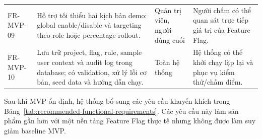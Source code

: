 \begin{table}[H]
\begin{tabular}{p{} p{} p{} p{}}
        FR-MVP-09 & Hỗ trợ tối thiểu hai kịch bản demo: global enable/disable và targeting theo role hoặc percentage rollout. & Quản trị viên, người dùng cuối & Người chấm có thể quan sát trực tiếp giá trị của Feature Flag. \\
        FR-MVP-10 & Lưu trữ project, flag, rule, sample user context và audit log trong database; có validation, xử lý lỗi cơ bản, seed data và hướng dẫn chạy. & Toàn hệ thống & Hệ thống có thể khởi chạy lặp lại và phục vụ kiểm thử/chấm điểm. \\
        \bottomrule
    \end{tabular}
\end{table}

Sau khi MVP ổn định, hệ thống bổ sung các yêu cầu khuyến khích trong Bảng~\ref{tab:recommended-functional-requirements}. Các yêu cầu này làm sản phẩm gần hơn với một nền tảng Feature Flag thực tế nhưng không được làm suy giảm baseline MVP.

